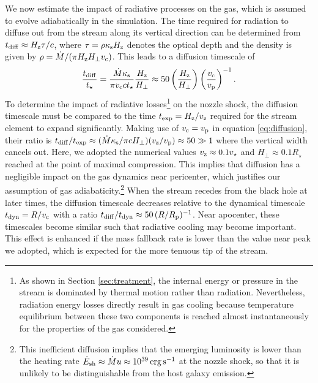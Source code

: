 \documentclass[a4paper,fleqn,usenatbib]{mnras}
\newcommand{\be}{\begin{equation}}
\newcommand{\ee}{\end{equation}}
\newcommand{\rstar}{R_{\star}}
\newcommand{\rp}{R_{\rm p}}
\def\ergpers{\, \rm erg\, s^{-1}}
\begin{document}
We now estimate the impact of radiative processes on the gas, which is assumed to evolve adiabatically in the simulation. The time required for radiation to diffuse out from the stream along its vertical direction can be determined from $t_{\rm diff} \approx H_{\rm z} \tau / c$, where $\tau = \rho \kappa_{\rm s} H_{\rm z}$ denotes the optical depth and the density is given by $\rho = \dot{M} / (\pi H_{\rm z} H_{\perp} v_{\rm c})$. This leads to a diffusion timescale of 
\be
\frac{t_{\rm diff}}{t_{\star}} = \frac{\dot{M}\kappa_{\rm s}}{\pi v_{\rm c} c t_{\star}} \frac{H_{\rm z}}{H_{\perp}} \approx 50 \left( \frac{H_{\rm z}}{H_{\perp}} \right) \left( \frac{v_{\rm c}}{v_{\rm p}} \right)^{-1}.
\label{eq:diffusion}
\ee
To determine the impact of radiative losses\footnote{As shown in Section \ref{sec:treatment}, the internal energy or pressure in the stream is dominated by thermal motion rather than radiation. Nevertheless, radiation energy losses directly result in gas cooling because temperature equilibrium between these two components is reached almost instantaneously for the properties of the gas considered.} on the nozzle shock, the diffusion timescale must be compared to the time $t_{\rm exp} = H_{\rm z} / v_{\rm z}$ required for the stream element to expand significantly. Making use of $v_{\rm c} = v_{\rm p}$ in equation \eqref{eq:diffusion}, their ratio is $t_{\rm diff} / t_{\rm exp} \approx (\dot{M}\kappa_{\rm s} / \pi c H_{\perp}) (v_{\rm z} / v_{\rm p}) \approx 50 \gg 1$ where the vertical width cancels out. Here, we adopted the numerical values $v_{\rm z} \approx 0.1 v_{\star}$ and $H_{\perp} \approx 0.1 \rstar$ reached at the point of maximal compression. This implies that diffusion has a negligible impact on the gas dynamics near pericenter, which justifies our assumption of gas adiabaticity.\footnote{This inefficient diffusion implies that the emerging luminosity is lower than the heating rate $\dot{E}_{\rm sh} \approx \dot{M} u \approx 10^{39} \ergpers$ at the nozzle shock, so that it is unlikely to be distinguishable from the host galaxy emission.} When the stream recedes from the black hole at later times, the diffusion timescale decreases relative to the dynamical timescale $t_{\rm dyn} = R/v_{\rm c}$ with a ratio $t_{\rm diff} / t_{\rm dyn} \approx 50 \, (R/\rp)^{-1}$. Near apocenter, these timescales become similar such that radiative cooling may become important. This effect is enhanced if the mass fallback rate is lower than the value near peak we adopted, which is expected for the more tenuous tip of the stream.
\end{document}
